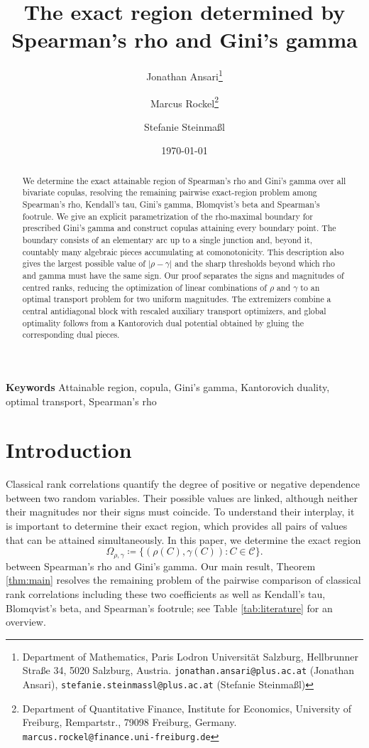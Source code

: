 \documentclass{article}
\title{\textbf{The exact region determined by Spearman's rho and Gini's gamma}}
\author{%
	Jonathan Ansari\thanks{Department of Mathematics, Paris Lodron Universit\"at Salzburg,
	Hellbrunner Stra\ss e 34, 5020 Salzburg, Austria.
	\texttt{jonathan.ansari@plus.ac.at} (Jonathan Ansari),
	\texttt{stefanie.steinmassl@plus.ac.at} (Stefanie Steinma\ss{}l)}
	\and
	Marcus Rockel\thanks{Department of Quantitative Finance, Institute for Economics,
	University of Freiburg, Rempartstr.\;16, 79098 Freiburg, Germany.
	\texttt{marcus.rockel@finance.uni-freiburg.de}}
	\and
	Stefanie Steinma\ss{}l\footnotemark[1]%
}
\date{\today}
\theoremstyle{definition}
\theoremstyle{remark}
\newcommand{\1}{\mathds{1}}
\newcommand{\CC}{\mathcal{C}}
\newcommand{\Om}{\Omega_{\rho,\gamma}}
\providecommand{\keywords}[1]{\noindent\textbf{Keywords } #1}
\begin{document}
\maketitle

\begin{abstract}
We determine the exact attainable region of Spearman's rho and Gini's gamma over all bivariate copulas, resolving the remaining pairwise exact-region problem among Spearman's rho, Kendall's tau, Gini's gamma, Blomqvist's beta and Spearman's footrule. 
We give an explicit parametrization of the rho-maximal boundary for prescribed Gini's gamma and construct copulas attaining every boundary point. The boundary consists of an elementary arc up to a single junction and, beyond it, countably many algebraic pieces accumulating at comonotonicity. This description also gives the largest possible value of \(|\rho-\gamma|\) and the sharp thresholds beyond which rho and gamma must have the same sign. Our proof separates the signs and magnitudes of centred ranks, reducing the optimization of linear combinations of \(\rho\) and \(\gamma\) to an optimal transport problem for two uniform magnitudes. The extremizers combine a central antidiagonal block with rescaled auxiliary transport optimizers, and global optimality follows from a Kantorovich dual potential obtained by gluing the corresponding dual pieces.
\end{abstract}

\keywords{Attainable region, copula, Gini's gamma, Kantorovich duality, optimal transport, Spearman's rho}


\section{Introduction}\label{sec:intro}

Classical rank correlations quantify the degree of positive or negative dependence between two random variables. Their possible values are linked, although neither
their magnitudes nor their signs must coincide. To understand their interplay, it is important to determine their exact region, which provides all pairs of values that can be attained simultaneously. 
In this paper, we determine the exact region
\begin{equation}\label{eq:region-def}
    \Om\coloneqq\{(\rho(C),\gamma(C)):C\in\CC\}.
\end{equation}
between Spearman's rho and Gini's gamma. Our main result, Theorem \ref{thm:main} resolves the remaining problem of the pairwise comparison of classical rank correlations including these two coefficients as well as Kendall's tau, Blomqvist's beta,
and Spearman's footrule; see Table \ref{tab:literature} for an overview.
\end{document}
